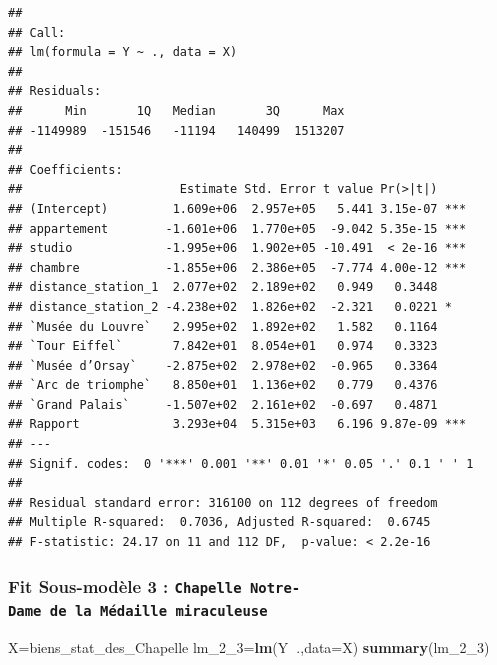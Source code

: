 \documentclass[french,]{article}
\newenvironment{Shaded}{\begin{snugshade}}{\end{snugshade}}
\newcommand{\DataTypeTok}[1]{\textcolor[rgb]{0.13,0.29,0.53}{#1}}
\newcommand{\DecValTok}[1]{\textcolor[rgb]{0.00,0.00,0.81}{#1}}
\newcommand{\KeywordTok}[1]{\textcolor[rgb]{0.13,0.29,0.53}{\textbf{#1}}}
\newcommand{\NormalTok}[1]{#1}
\newcommand{\OperatorTok}[1]{\textcolor[rgb]{0.81,0.36,0.00}{\textbf{#1}}}
\begin{document}
\begin{verbatim}
## 
## Call:
## lm(formula = Y ~ ., data = X)
## 
## Residuals:
##      Min       1Q   Median       3Q      Max 
## -1149989  -151546   -11194   140499  1513207 
## 
## Coefficients:
##                      Estimate Std. Error t value Pr(>|t|)    
## (Intercept)         1.609e+06  2.957e+05   5.441 3.15e-07 ***
## appartement        -1.601e+06  1.770e+05  -9.042 5.35e-15 ***
## studio             -1.995e+06  1.902e+05 -10.491  < 2e-16 ***
## chambre            -1.855e+06  2.386e+05  -7.774 4.00e-12 ***
## distance_station_1  2.077e+02  2.189e+02   0.949   0.3448    
## distance_station_2 -4.238e+02  1.826e+02  -2.321   0.0221 *  
## `Musée du Louvre`   2.995e+02  1.892e+02   1.582   0.1164    
## `Tour Eiffel`       7.842e+01  8.054e+01   0.974   0.3323    
## `Musée d’Orsay`    -2.875e+02  2.978e+02  -0.965   0.3364    
## `Arc de triomphe`   8.850e+01  1.136e+02   0.779   0.4376    
## `Grand Palais`     -1.507e+02  2.161e+02  -0.697   0.4871    
## Rapport             3.293e+04  5.315e+03   6.196 9.87e-09 ***
## ---
## Signif. codes:  0 '***' 0.001 '**' 0.01 '*' 0.05 '.' 0.1 ' ' 1
## 
## Residual standard error: 316100 on 112 degrees of freedom
## Multiple R-squared:  0.7036, Adjusted R-squared:  0.6745 
## F-statistic: 24.17 on 11 and 112 DF,  p-value: < 2.2e-16
\end{verbatim}

\hypertarget{fit-sous-moduxe8le-3-chapelle-notre-dame-de-la-muxe9daille-miraculeuse}{%
\subsubsection{\texorpdfstring{Fit Sous-modèle 3 :
\texttt{Chapelle\ Notre-Dame\ de\ la\ Médaille\ miraculeuse}}{Fit Sous-modèle 3 : Chapelle Notre-Dame de la Médaille miraculeuse}}\label{fit-sous-moduxe8le-3-chapelle-notre-dame-de-la-muxe9daille-miraculeuse}}

\begin{Shaded}
\begin{Highlighting}[]
\NormalTok{X=biens_stat_des_Chapelle}
\NormalTok{lm_}\DecValTok{2}\NormalTok{_}\DecValTok{3}\NormalTok{=}\KeywordTok{lm}\NormalTok{(Y}\OperatorTok{~}\NormalTok{.,}\DataTypeTok{data=}\NormalTok{X)  }
\KeywordTok{summary}\NormalTok{(lm_}\DecValTok{2}\NormalTok{_}\DecValTok{3}\NormalTok{)}
\end{Highlighting}
\end{Shaded}
\end{document}
